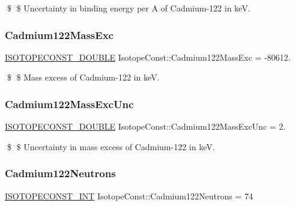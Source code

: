 \$ \$ Uncertainty in binding energy per A of Cadmium-\/122 in keV. \mbox{\label{group___isotope_const-_cadmium-_cd122_ga32b29f266f8020ce76863d7b9de7efcd}} 
\subsubsection{\texorpdfstring{Cadmium122\+Mass\+Exc}{Cadmium122MassExc}}
{\footnotesize\ttfamily \mbox{\hyperlink{group___isotope_const-_macros_ga8f45a7272ce02c0b4c65c44636ed719a}{I\+S\+O\+T\+O\+P\+E\+C\+O\+N\+S\+T\+\_\+\+D\+O\+U\+B\+LE}} Isotope\+Const\+::\+Cadmium122\+Mass\+Exc = -\/80612.}

\$ \$ Mass excess of Cadmium-\/122 in keV. \mbox{\label{group___isotope_const-_cadmium-_cd122_ga49da5422d4079acaab633240dced4007}} 
\subsubsection{\texorpdfstring{Cadmium122\+Mass\+Exc\+Unc}{Cadmium122MassExcUnc}}
{\footnotesize\ttfamily \mbox{\hyperlink{group___isotope_const-_macros_ga8f45a7272ce02c0b4c65c44636ed719a}{I\+S\+O\+T\+O\+P\+E\+C\+O\+N\+S\+T\+\_\+\+D\+O\+U\+B\+LE}} Isotope\+Const\+::\+Cadmium122\+Mass\+Exc\+Unc = 2.}

\$ \$ Uncertainty in mass excess of Cadmium-\/122 in keV. \mbox{\label{group___isotope_const-_cadmium-_cd122_ga6765ccfdb193fc9574958ceffdfe7792}} 
\subsubsection{\texorpdfstring{Cadmium122\+Neutrons}{Cadmium122Neutrons}}
{\footnotesize\ttfamily \mbox{\hyperlink{group___isotope_const-_macros_ga5f18360b3e99483a35c32d789e62621c}{I\+S\+O\+T\+O\+P\+E\+C\+O\+N\+S\+T\+\_\+\+I\+NT}} Isotope\+Const\+::\+Cadmium122\+Neutrons = 74}

